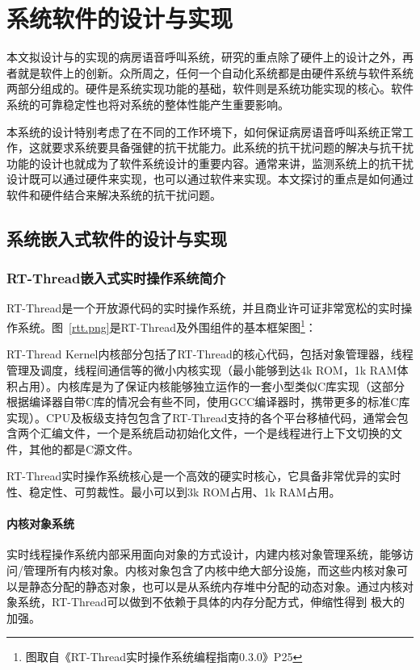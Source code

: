 
\chapter{系统软件的设计与实现}
本文拟设计与的实现的病房语音呼叫系统，研究的重点除了硬件上的设计之外，再者就是软件上的创新。众所周之，任何一个自动化系统都是由硬件系统与软件系统两部分组成的。硬件是系统实现功能的基础，软件则是系统功能实现的核心。软件系统的可靠稳定性也将对系统的整体性能产生重要影响。

本系统的设计特别考虑了在不同的工作环境下，如何保证病房语音呼叫系统正常工作，这就要求系统要具备强健的抗干扰能力。此系统的抗干扰问题的解决与抗干扰功能的设计也就成为了软件系统设计的重要内容。通常来讲，监测系统上的抗干扰设计既可以通过硬件来实现，也可以通过软件来实现。本文探讨的重点是如何通过软件和硬件结合来解决系统的抗干扰问题。

\section{系统嵌入式软件的设计与实现}
\subsection{RT-Thread嵌入式实时操作系统简介}
RT-Thread是一个开放源代码的实时操作系统，并且商业许可证非常宽松的实时操作系统。图~\ref{rtt.png}是RT-Thread及外围组件的基本框架图\footnote{图取自《RT-Thread实时操作系统编程指南0.3.0》P25}：

RT-Thread Kernel内核部分包括了RT-Thread的核心代码，包括对象管理器，线程管理及调度，线程间通信等的微小内核实现（最小能够到达4k ROM，1k RAM体积占用）。内核库是为了保证内核能够独立运作的一套小型类似C库实现（这部分根据编译器自带C库的情况会有些不同，使用GCC编译器时，携带更多的标准C库实现）。CPU及板级支持包包含了RT-Thread支持的各个平台移植代码，通常会包含两个汇编文件，一个是系统启动初始化文件，一个是线程进行上下文切换的文件，其他的都是C源文件。

RT-Thread实时操作系统核心是一个高效的硬实时核心，它具备非常优异的实时性、稳定性、可剪裁性。最小可以到3k ROM占用、1k RAM占用。

\subsubsection{内核对象系统}
实时线程操作系统内部采用面向对象的方式设计，内建内核对象管理系统，能够访问/管理所有内核对象。内核对象包含了内核中绝大部分设施，而这些内核对象可 以是静态分配的静态对象，也可以是从系统内存堆中分配的动态对象。通过内核对象系统，RT-Thread可以做到不依赖于具体的内存分配方式，伸缩性得到 极大的加强。

